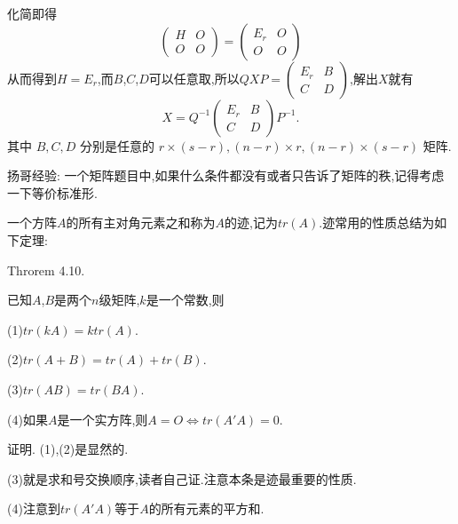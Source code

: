 \documentclass{article}
\begin{document}
化简即得
\begin{equation*}
    \left(\begin{array}{ll}
        H & O \\
        O & O
    \end{array}\right)=\left(\begin{array}{cc}
        E_{r} & O \\
        O     & O
    \end{array}\right)
\end{equation*}
从而得到$H = E_r$,而$B$,$C$,$D$可以任意取,所以$Q X P = \left(
    \begin{array}{cc}
            E_r & B \\
            C   & D
        \end{array}
    \right)$,解出$X$就有
\begin{equation*}
    X=Q^{-1}\left(\begin{array}{cc}
            E_{r} & B \\
            C     & D
        \end{array}\right) P^{-1}.
\end{equation*}
其中 $B, C, D$ 分别是任意的 $r \times(s-r),(n-r) \times r,(n-r) \times(s-r)$ 矩阵.

\vspace{1ex}
{\heiti 扬哥经验: 一个矩阵题目中,如果什么条件都没有或者只告诉了矩阵的秩,记得考虑一下等价标准形.}

\vspace{2ex}
\vspace{2ex}

一个方阵$A$的所有主对角元素之和称为$A$的迹,记为$t r \left(A\right)$.迹常用的性质总结为如下定理:

{\heiti Throrem 4.10.}
{\kaishu 已知$A$,$B$是两个$n$级矩阵,$k$是一个常数,则

(1)$tr \left(kA\right) =ktr \left(A\right)$.

(2)$tr \left(A + B\right) = tr \left(A\right) + tr \left(B\right)$.

(3)$tr \left(AB\right) = tr \left(BA\right)$.

(4)如果$A$是一个实方阵,则$A = O \Longleftrightarrow tr \left(A'A\right) = 0$.}

\vspace{1ex}
{\heiti 证明.} (1),(2)是显然的.

(3)就是求和号交换顺序,读者自己证.注意本条是迹最重要的性质.

(4)注意到$tr \left(A'A\right)$等于$A$的所有元素的平方和.
\end{document}

